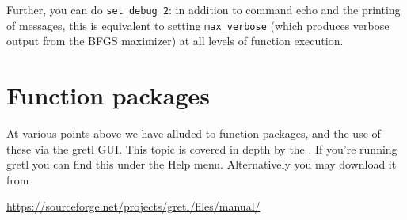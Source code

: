 Further, you can do \texttt{set debug 2}: in addition to command echo
and the printing of messages, this is equivalent to setting
\verb|max_verbose| (which produces verbose output from the BFGS
maximizer) at all levels of function execution.

\section{Function packages}
\label{sec:func-packages}

At various points above we have alluded to function packages, and the
use of these via the gretl GUI. This topic is covered in depth by the
\PKGBOOK. If you're running gretl you can find this under the
\textsf{Help} menu. Alternatively you may download it from

\url{https://sourceforge.net/projects/gretl/files/manual/}


